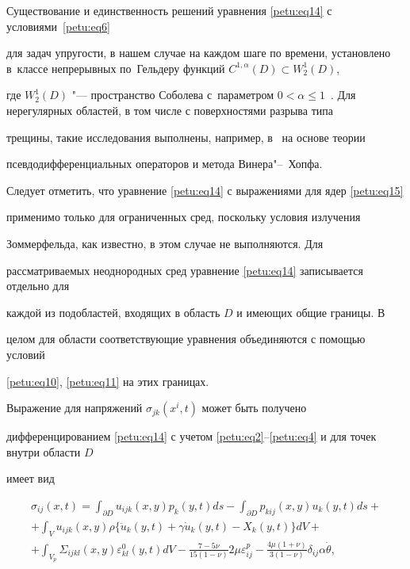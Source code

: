 Существование и единственность решений уравнения \eqref{petu:eq14} с условиями~\eqref{petu:eq6}

для задач упругости, в нашем случае на каждом шаге по времени, установлено в~классе непрерывных по~Гельдеру функций $C^{1,\alpha }(D)\subset W_2^1 (D)$,

где $W_2^1 (D)$ "--- пространство Соболева с~параметром $0<\alpha \le 1$~\cite{petu:bib7,petu:bib16}. Для нерегулярных областей, в том числе с поверхностями разрыва типа

трещины, такие исследования выполнены, например, в~\cite{petu:bib16} на основе теории

псевдодифференциальных операторов и метода Винера"--~Хопфа.



Следует отметить, что уравнение \eqref{petu:eq14} с выражениями для ядер \eqref{petu:eq15}

применимо только для ограниченных сред, поскольку условия излучения

Зоммерфельда, как известно, в этом случае не выполняются. Для

рассматриваемых неоднородных сред уравнение \eqref{petu:eq14} записывается отдельно для

каждой из подобластей, входящих в область $D$ и имеющих общие границы. В

целом для области соответствующие уравнения объединяются с помощью условий

\eqref{petu:eq10}, \eqref{petu:eq11} на этих границах.



Выражение для напряжений $\sigma _{jk} (x^i,t)$ может быть получено

дифференцированием \eqref{petu:eq14} с учетом \eqref{petu:eq2}--\eqref{petu:eq4} и для точек внутри области $D$

имеет вид

\begin{multline}

\label{petu:eq16}

\sigma _{ij} (x,t)=\int _{\partial D} u_{ijk} (x,y) p_k

(y,t)ds-\int _{\partial D} p_{kij} (x,y)u_k (y,t)ds+ \\

 +\int _V u_{ijk} (x,y)\rho \bigl \{\ddot {u}_k (y,t)+\gamma \dot {u}_k

(y,t)-X_k (y,t) \bigr \}dV + \\

+\int _{V_p} \Sigma _{ijkl} (x,y)\varepsilon_{kl}^0 (y,t)dV

-\frac{7-5\nu }{15(1-\nu )}2\mu \varepsilon _{ij}^p -\frac{4\mu (1+\nu

)}{3(1-\nu )}\delta _{ij} \alpha \dot {\theta },

\end{multline}


